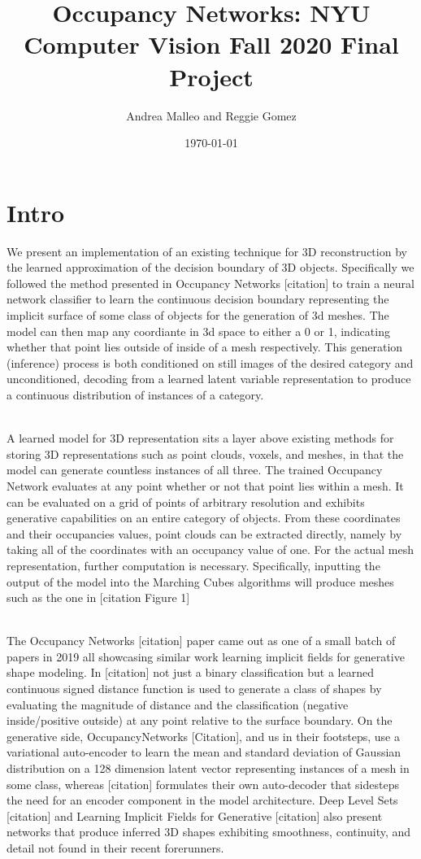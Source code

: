 \documentclass[11pt]{article}
\author{Andrea Malleo and Reggie Gomez}
\date{\today}
\title{Occupancy Networks: NYU Computer Vision Fall 2020 Final Project}
\begin{document}
\maketitle
\section{Intro}

\begin{multicols}{2}
We present an implementation of an existing technique for 3D reconstruction by the learned approximation of the decision boundary of 3D objects. Specifically we followed the method presented in Occupancy Networks [citation] to train a neural network classifier to learn the continuous decision boundary representing the implicit surface of some class of objects for the generation of 3d meshes. The model can then map any coordiante in 3d space to either a 0 or 1, indicating whether that point lies outside of inside of a mesh respectively. This generation (inference) process is both conditioned on still images of the desired category and unconditioned, decoding from a learned latent variable representation to produce a continuous distribution of instances of a category.
\par
\\
A learned model for 3D representation sits a layer above existing methods for storing 3D representations such as point clouds, voxels, and meshes, in that the model can generate countless instances of all three. The trained Occupancy Network evaluates at any point whether or not that point lies within a mesh. It can be evaluated on a grid of points of arbitrary resolution and exhibits generative capabilities on an entire category of objects. From these coordinates and their occupancies values, point clouds can be extracted directly, namely by taking all of the coordinates with an occupancy value of one. For the actual mesh representation, further computation is necessary. Specifically, inputting the output of the model into the Marching Cubes algorithms will produce meshes such as the one in [citation Figure 1]

\\
The Occupancy Networks [citation] paper came out as one of a small batch of papers in 2019 all showcasing similar work learning implicit fields for generative shape modeling. In [citation] not just a binary classification but a learned continuous signed distance function is used to generate a class of shapes by evaluating the magnitude of distance and the classification (negative inside/positive outside) at any point relative to the surface boundary. On the generative side, OccupancyNetworks [Citation], and us in their footsteps, use a variational auto-encoder to learn the mean and standard deviation of Gaussian distribution on a 128 dimension latent vector representing instances of a mesh in some class, whereas [citation] formulates their own auto-decoder that sidesteps the need for an encoder component in the model architecture. Deep Level Sets [citation] and Learning Implicit Fields for Generative [citation] also present networks that produce inferred 3D shapes exhibiting smoothness, continuity, and detail not found in their recent forerunners.


\end{multicols}
\end{document}
